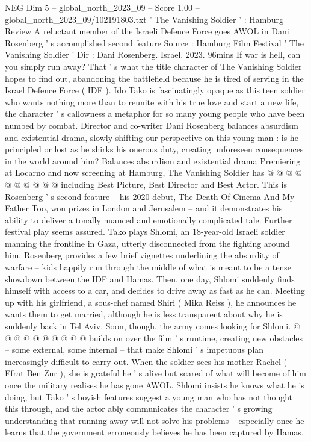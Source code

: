 \begin{textsample}{NEG Dim 5 – global\_north\_2023\_09 – Score 1.00 – global\_north\_2023\_09/102191803.txt}  \label{ex:f5_neg_017}
' The Vanishing Soldier ' : Hamburg Review A reluctant member of the Israeli Defence Force goes AWOL in Dani Rosenberg ' s accomplished second feature Source : Hamburg Film Festival ' The Vanishing Soldier ' Dir : Dani Rosenberg.
Israel. 2023. 96mins If war is hell, can you simply run away?
That ' s what the title character of The Vanishing Soldier hopes to find out, abandoning the battlefield because he is tired of serving in the Israel Defence Force ( IDF ).
Ido Tako is fascinatingly opaque as this teen soldier who wants nothing more than to reunite with his true love and start a new life, the character ' s callowness a metaphor for so many young people who have been numbed by combat.
Director and co-writer Dani Rosenberg balances absurdism and existential drama, slowly shifting our perspective on this young man : is he principled or lost as he shirks his onerous duty, creating unforeseen consequences in the world around him?
Balances absurdism and existential drama Premiering at Locarno and now screening at Hamburg, The Vanishing Soldier has @ @ @ @ @ @ @ @ @ @ including Best Picture, Best Director and Best Actor.
This is Rosenberg ' s second feature -- his 2020 debut, The Death Of Cinema And My Father Too, won prizes in London and Jerusalem -- and it demonstrates his ability to deliver a tonally nuanced and emotionally complicated tale.
Further festival play seems assured.
Tako plays Shlomi, an 18-year-old Israeli soldier manning the frontline in Gaza, utterly disconnected from the fighting around him.
Rosenberg provides a few brief vignettes underlining the absurdity of warfare -- kids happily run through the middle of what is meant to be a tense showdown between the IDF and Hamas.
Then, one day, Shlomi suddenly finds himself with access to a car, and decides to drive away as fast as he can.
Meeting up with his girlfriend, a sous-chef named Shiri ( Mika Reiss ), he announces he wants them to get married, although he is less transparent about why he is suddenly back in Tel Aviv.
Soon, though, the army comes looking for Shlomi. @ @ @ @ @ @ @ @ @ @ builds on over the film ' s runtime, creating new obstacles -- some external, some internal -- that make Shlomi ' s impetuous plan increasingly difficult to carry out.
When the soldier sees his mother Rachel ( Efrat Ben Zur ), she is grateful he ' s alive but scared of what will become of him once the military realises he has gone AWOL.
Shlomi insists he knows what he is doing, but Tako ' s boyish features suggest a young man who has not thought this through, and the actor ably communicates the character ' s growing understanding that running away will not solve his problems -- especially once he learns that the government erroneously believes he has been captured by Hamas.

\end{textsample}

